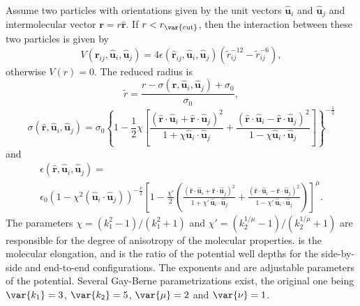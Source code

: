 Assume two particles with orientations given by the unit vectors
$\mathbf{\hat{u}}_i$ and $\mathbf{\hat{u}}_j$ and intermolecular vector
$\mathbf{r} = r\mathbf{\hat{r}}$. If $r<r_\mathrm{\var{cut}}$, then the
interaction between these two particles is given by
\begin{equation}
  V(\mathbf{r}_{ij}, \mathbf{\hat{u}}_i, \mathbf{\hat{u}}_j) = 4
  \epsilon(\mathbf{\hat{r}}_{ij}, \mathbf{\hat{u}}_i,
  \mathbf{\hat{u}}_j) \left( \tilde{r}_{ij}^{-12}-\tilde{r}_{ij}^{-6}
  \right),
\end{equation}
otherwise $V(r)=0$. The reduced radius is
\begin{equation}
  \tilde{r}=\frac{r - \sigma(\mathbf{\hat{r}},
    \mathbf{\hat{u}}_i, \mathbf{\hat{u}}_j)+\sigma_0}{\sigma_0},
\end{equation}
\begin{equation}
  \sigma( \mathbf{\hat{r}}, \mathbf{\hat{u}}_i,
  \mathbf{\hat{u}}_j) = \sigma_{0} \left\{ 1 - \frac{1}{2} \chi \left[
      \frac{ \left( \mathbf{\hat{r}} \cdot \mathbf{\hat{u}}_i +
          \mathbf{\hat{r}} \cdot \mathbf{\hat{u}}_j \right)^{2} }
      {1 + \chi \mathbf{\hat{u}}_i \cdot \mathbf{\hat{u}}_j } +
      \frac{ \left( \mathbf{\hat{r}} \cdot \mathbf{\hat{u}}_i -
          \mathbf{\hat{r}} \cdot \mathbf{\hat{u}}_j \right)^{2} }
      {1 - \chi \mathbf{\hat{u}}_i \cdot \mathbf{\hat{u}}_j}
    \right] \right\}^{-\frac{1}{2}}
\end{equation}
and
\begin{multline}
  \epsilon(\mathbf{\hat{r}}, \mathbf{\hat{u}}_i,
  \mathbf{\hat{u}}_j) = \\
  \epsilon_0 \left( 1- \chi^{2}(\mathbf{\hat{u}}_i
    \cdot \mathbf{\hat{u}}_j) \right)^{-\frac {\nu}{2}} \left[1-\frac
    {\chi'}{2} \left( \frac { (\mathbf{\hat{r}} \cdot
        \mathbf{\hat{u}}_i+ \mathbf{\hat{r}} \cdot
        \mathbf{\hat{u}}_j)^{2}} {1+\chi' \, \mathbf{\hat{u}}_i \cdot
        \mathbf{\hat{u}}_j }+ \frac {(\mathbf{\hat{r}} \cdot
        \mathbf{\hat{u}}_i-\mathbf{\hat{r}} \cdot
        \mathbf{\hat{u}}_j)^{2}} {1-\chi' \, \mathbf{\hat{u}}_i \cdot
        \mathbf{\hat{u}}_j } \right) \right]^{\mu}.
\end{multline}
The parameters $\chi = \left(k_1^{2} - 1\right)/\left(k_1^{2} +
  1\right)$ and $\chi' = \left(k_2^{1/\mu} -
  1\right)/\left(k_2^{1/\mu} + 1\right)$ are responsible for the
degree of anisotropy of the molecular properties.   is the
molecular elongation, and  is the ratio of the potential well
depths for the side-by-side and end-to-end configurations.  The
exponents \var{\mu} and \var{\nu} are adjustable parameters of the
potential.  Several Gay-Berne parametrizations exist, the original one
being $\var{k_1} = 3$, $\var{k_2} = 5$, $\var{\mu} = 2$ and $\var{\nu}
= 1$.

